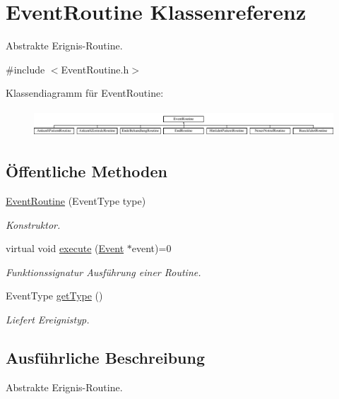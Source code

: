 \hypertarget{classEventRoutine}{}\section{Event\+Routine Klassenreferenz}
\label{classEventRoutine}


Abstrakte Erignis-\/\+Routine.  




{\ttfamily \#include $<$Event\+Routine.\+h$>$}

Klassendiagramm für Event\+Routine\+:\begin{figure}[H]
\begin{center}
\leavevmode
\includegraphics[height=1.012658cm]{classEventRoutine}
\end{center}
\end{figure}
\subsection*{Öffentliche Methoden}
\begin{DoxyCompactItemize}
\item 
\hyperlink{classEventRoutine_acd33ef6e5acc459719005276cc9c55e9}{Event\+Routine} (Event\+Type type)
\begin{DoxyCompactList}\small\item\em Konstruktor. \end{DoxyCompactList}\item 
virtual void \hyperlink{classEventRoutine_aede9b0fdb576a4a262ced2d7d6548c14}{execute} (\hyperlink{classEvent}{Event} $\ast$event)=0
\begin{DoxyCompactList}\small\item\em Funktionssignatur Ausführung einer Routine. \end{DoxyCompactList}\item 
Event\+Type \hyperlink{classEventRoutine_afcaf1409efcd2b6572b54c7a6fc02428}{get\+Type} ()
\begin{DoxyCompactList}\small\item\em Liefert Ereignistyp. \end{DoxyCompactList}\end{DoxyCompactItemize}


\subsection{Ausführliche Beschreibung}
Abstrakte Erignis-\/\+Routine. 

